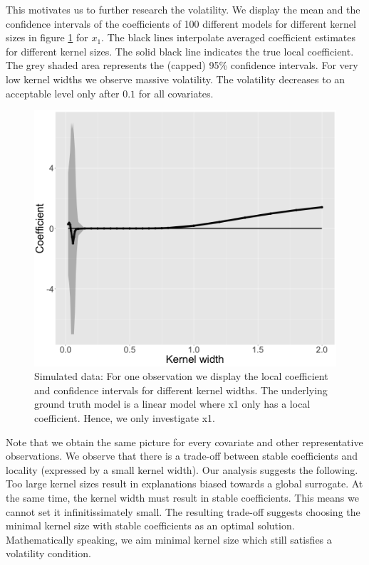 \documentclass[]{krantz}
\begin{document}
This motivates us to further research the volatility. We display the
mean and the confidence intervals of the coefficients of 100 different
models for different kernel sizes in figure \ref{fig:lime-fig11} for
\(x_1\). The black lines interpolate averaged coefficient estimates for
different kernel sizes. The solid black line indicates the true local
coefficient. The grey shaded area represents the (capped) 95\%
confidence intervals. For very low kernel widths we observe massive
volatility. The volatility decreases to an acceptable level only after
\(0.1\) for all covariates.

\begin{figure}

{\centering \includegraphics[width=0.99\linewidth]{images/04-09-11-1} 

}

\caption{Simulated data: For one observation we display the local coefficient and confidence intervals for different kernel widths. The underlying ground truth model is a linear model where x1 only has a local coefficient. Hence, we only investigate x1.}\label{fig:lime-fig11}
\end{figure}

Note that we obtain the same picture for every covariate and other
representative observations. We observe that there is a trade-off
between stable coefficients and locality (expressed by a small kernel
width). Our analysis suggests the following. Too large kernel sizes
result in explanations biased towards a global surrogate. At the same
time, the kernel width must result in stable coefficients. This means we
cannot set it infinitissimately small. The resulting trade-off suggests
choosing the minimal kernel size with stable coefficients as an optimal
solution. Mathematically speaking, we aim minimal kernel size which
still satisfies a volatility condition.
\end{document}

